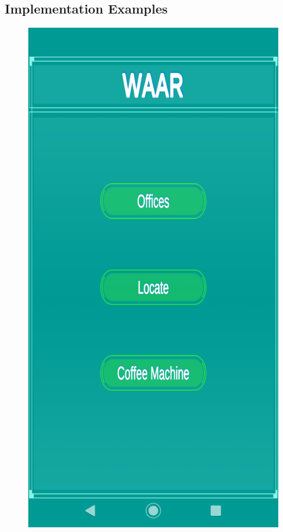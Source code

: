 \documentclass{aifyp}
\begin{document}
\begin{appendices}
\section{Implementation Examples}
\begin{figure}[H]
    \centering
        \begin{minipage}{.5\textwidth}
          \centering
          \includegraphics[scale=0.2]{Images/Chapter5/Impl3.png}

\end{minipage}
\end{figure}
\end{appendices}
\end{document}
